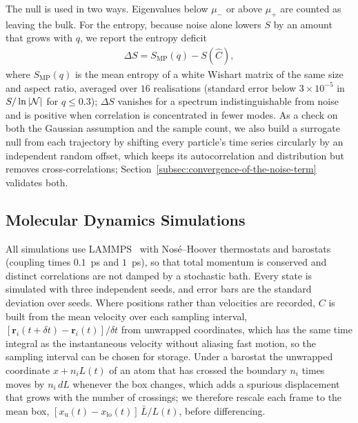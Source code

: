 The null is used in two ways.
Eigenvalues below $\mu_{-}$ or above $\mu_{+}$ are counted as leaving the bulk.
For the entropy, because noise alone lowers $S$ by an amount that grows with $q$, we report the entropy deficit
\begin{align}
    \Delta S = S_{\text{MP}}(q) - S(\hat{C}),
    \label{eqn:entropy-deficit}
\end{align}
where $S_{\text{MP}}(q)$ is the mean entropy of a white Wishart matrix of the same size and aspect ratio, averaged over $16$ realisations (standard error below $3 \times 10^{-5}$ in $S/\ln|\mathcal{N}|$ for $q \le 0.3$); $\Delta S$ vanishes for a spectrum indistinguishable from noise and is positive when correlation is concentrated in fewer modes.
As a check on both the Gaussian assumption and the sample count, we also build a surrogate null from each trajectory by shifting every particle's time series circularly by an independent random offset, which keeps its autocorrelation and distribution but removes cross-correlations; Section~\ref{subsec:convergence-of-the-noise-term} validates both.

\subsection{Molecular Dynamics Simulations}
\label{subsec:molecular-dynamics-simulations}
All simulations use LAMMPS~\cite{thompson2022} with Nos\'e--Hoover thermostats and barostats (coupling times $0.1$~ps and $1$~ps), so that total momentum is conserved and distinct correlations are not damped by a stochastic bath.
Every state is simulated with three independent seeds, and error bars are the standard deviation over seeds.
Where positions rather than velocities are recorded, $C$ is built from the mean velocity over each sampling interval, $[\mathbf{r}_{i}(t + \delta t) - \mathbf{r}_{i}(t)]/\delta t$ from unwrapped coordinates, which has the same time integral as the instantaneous velocity without aliasing fast motion, so the sampling interval can be chosen for storage.
Under a barostat the unwrapped coordinate $x + n_{i}L(t)$ of an atom that has crossed the boundary $n_{i}$ times moves by $n_{i}\,dL$ whenever the box changes, which adds a spurious displacement that grows with the number of crossings; we therefore rescale each frame to the mean box, $[x_{\text{u}}(t) - x_{\text{lo}}(t)]\,\bar{L}/L(t)$, before differencing.

